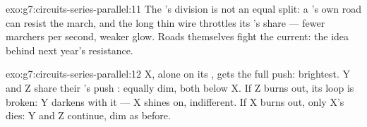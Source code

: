 \begin{solution}{exo:g7:circuits-series-parallel:11}
The 's division is not an equal split: a 's own
road can resist the march, and the long thin wire throttles its
's share --- fewer marchers per second, weaker glow. Roads
themselves fight the current: the idea behind next year's
resistance.
\end{solution}

\begin{solution}{exo:g7:circuits-series-parallel:12}
X, alone on its , gets the full push: brightest. Y and Z
share their 's push : equally dim, both below X.
If Z burns out, its loop is broken: Y darkens with it --- X
shines on, indifferent. If X burns out, only X's  dies: Y
and Z continue, dim as before.
\end{solution}

